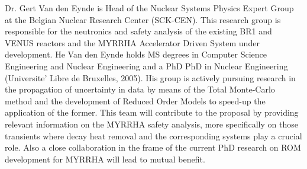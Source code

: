 Dr. Gert Van den Eynde is Head of the Nuclear Systems Physics Expert Group at
the Belgian Nuclear Research Center (SCK-CEN). This research group is
responsible for the neutronics and safety analysis of the existing BR1 and
VENUS reactors and the MYRRHA Accelerator Driven System under development. He
  Van den Eynde holds MS degrees in Computer Science Engineering and 
Nuclear Engineering and a PhD PhD in Nuclear
Engineering (Universite' Libre de Bruxelles, 2005). 
   His group is actively pursuing research in
the propagation of
uncertainty in data by means of the Total Monte-Carlo method and the
development of Reduced Order Models to speed-up the application of the former.
  This team will contribute to the proposal by providing relevant information
on the MYRRHA safety analysis, more specifically on those transients where
decay heat removal and the corresponding systems play a crucial role. Also a
close collaboration in the frame of the current PhD research on ROM development
for MYRRHA will lead to mutual benefit.  
